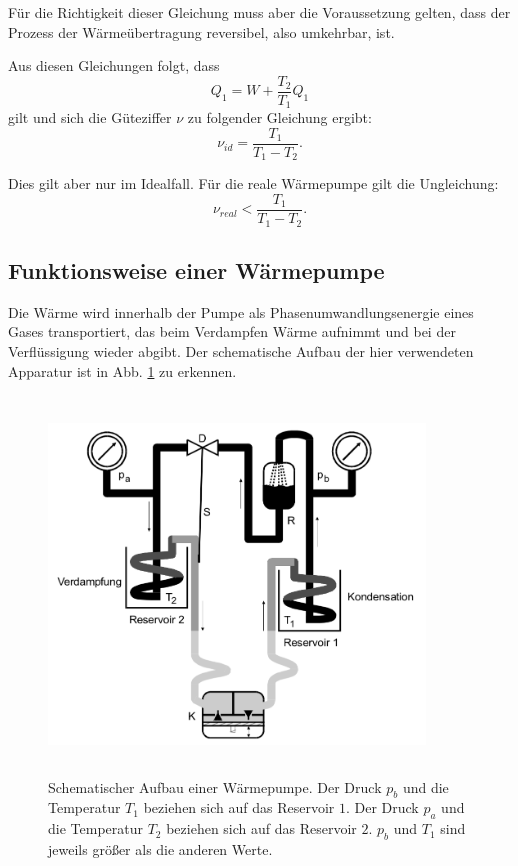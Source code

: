 \noindent Für die Richtigkeit dieser Gleichung muss aber die Voraussetzung gelten, dass der 
Prozess der Wärmeübertragung reversibel, also umkehrbar, ist. 

\noindent Aus diesen Gleichungen folgt, dass 
\begin{equation*}
    Q_1 = W+ \frac{T_2}{T_1} Q_1 
\end{equation*}
gilt und sich die Güteziffer $\nu$ zu folgender Gleichung ergibt: 
\begin{equation}
    \nu_{id}= \frac{T_1}{T_1-T_2}.
    \label{eqn:ideal}
\end{equation} 

\noindent Dies gilt aber nur im Idealfall. Für die reale Wärmepumpe gilt die 
Ungleichung:
\begin{equation*}
    \nu_{real} < \frac{T_1}{T_1-T_2}.
\end{equation*}

\subsection{Funktionsweise einer Wärmepumpe}
Die Wärme wird innerhalb der Pumpe als Phasenumwandlungsenergie eines Gases 
transportiert, das beim Verdampfen Wärme aufnimmt und bei der Verflüssigung wieder 
abgibt. Der schematische Aufbau der hier verwendeten Apparatur ist in Abb. \ref{fig:aufbau1} zu 
erkennen.
\begin{figure}
    \centering
    \includegraphics[width=10cm, height=10cm]{build/1.png}
    \caption{Schematischer Aufbau einer Wärmepumpe. Der Druck $p_b$ und die Temperatur
    $T_1$ beziehen sich auf das Reservoir $\num{1}$. Der Druck $p_a$ und die Temperatur
    $T_2$ beziehen sich auf das Reservoir $\num{2}$. $p_b$ und $T_1$ sind jeweils
    größer als die anderen Werte.} %
    \label{fig:aufbau1}
\end{figure}

